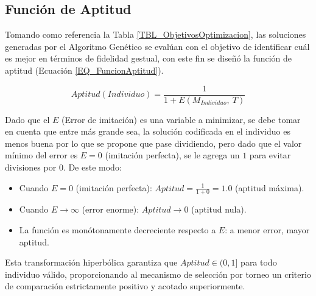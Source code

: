\subsection{Función de Aptitud}
Tomando como referencia la Tabla \ref{TBL_ObjetivosOptimizacion}, las soluciones generadas por el Algoritmo Genético se evalúan con el objetivo de identificar cuál es mejor en términos de fidelidad gestual, con este fin se diseñó la función de aptitud (Ecuación \ref{EQ_FuncionAptitud}).

\begin{equation}
    Aptitud(Individuo) = \frac{1}{1 + E(M_{Individuo},\ T)}
    \label{EQ_FuncionAptitud}
\end{equation}

Dado que el $E$ (Error de imitación) es una variable a minimizar, se debe tomar en cuenta que entre más grande sea, la solución codificada en el individuo es menos buena por lo que se propone que pase dividiendo, pero dado que el valor mínimo del error es $E = 0$ (imitación perfecta), se le agrega un $1$ para evitar divisiones por $0$. De este modo:

\begin{itemize}
    \item Cuando $E = 0$ (imitación perfecta): $Aptitud = \frac{1}{1+0} = 1.0$ (aptitud máxima).
    \item Cuando $E \to \infty$ (error enorme): $Aptitud \to 0$ (aptitud nula).
    \item La función es monótonamente decreciente respecto a $E$: a menor error, mayor aptitud.
\end{itemize}

Esta transformación hiperbólica garantiza que $Aptitud \in (0, 1]$ para todo individuo válido, proporcionando al mecanismo de selección por torneo un criterio de comparación estrictamente positivo y acotado superiormente.

\clearpage
